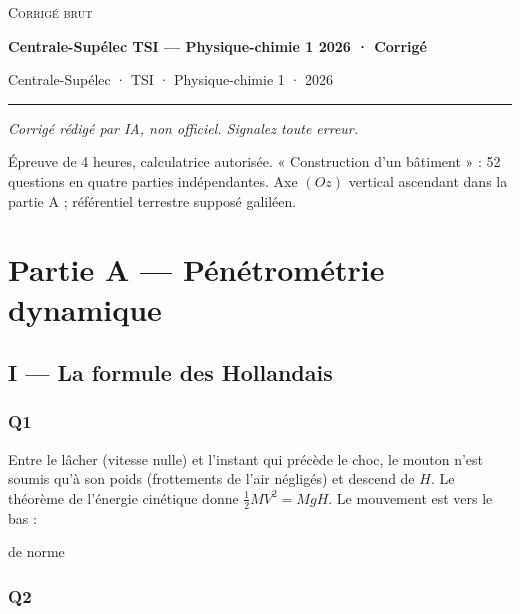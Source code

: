 \documentclass[11pt,a4paper]{article}
\newcommand{\equationajustee}[1]{%
  \sbox{\boiteequation}{$\displaystyle #1$}%
  \ifdim\wd\boiteequation>\linewidth
    \[\resizebox{\linewidth}{!}{\usebox{\boiteequation}}\]%
  \else
    \[#1\]%
  \fi}
\begin{document}
\thispagestyle{plain}
\begin{center}
  {\small\scshape Corrigé brut}\par\smallskip
  {\LARGE\bfseries Centrale-Supélec TSI — Physique-chimie 1 2026 · Corrigé\par}\medskip
  {\large Centrale-Supélec · TSI · Physique-chimie 1 · 2026\par}
\end{center}
\vspace{2pt}\hrule\vspace{8pt}

\emph{Corrigé rédigé par IA, non officiel. Signalez toute erreur.}

Épreuve de 4 heures, calculatrice autorisée. « Construction d'un bâtiment » : 52 questions en quatre parties indépendantes. Axe \((Oz)\) vertical ascendant dans la partie A ; référentiel terrestre supposé galiléen.

\hypertarget{partie-a-puxe9nuxe9tromuxe9trie-dynamique}{%
\section{Partie A --- Pénétrométrie dynamique}\label{partie-a-puxe9nuxe9tromuxe9trie-dynamique}}

\hypertarget{i-la-formule-des-hollandais}{%
\subsection{I --- La formule des Hollandais}\label{i-la-formule-des-hollandais}}

\hypertarget{q1}{%
\subsubsection{Q1}\label{q1}}

Entre le lâcher (vitesse nulle) et l'instant qui précède le choc, le mouton n'est soumis qu'à son poids (frottements de l'air négligés) et descend de \(H\). Le théorème de l'énergie cinétique donne \(\tfrac12 MV^2 = MgH\). Le mouvement est vers le bas :

\equationajustee{\boxed{\vec V = -\sqrt{2gH}\,\vec e_z}}

de norme

\equationajustee{\boxed{V = \sqrt{2\times 9{,}8\times 0{,}50} = 3{,}1\ \mathrm{m\cdot s^{-1}}}}

\hypertarget{q2}{%
\subsubsection{Q2}\label{q2}}
\end{document}
